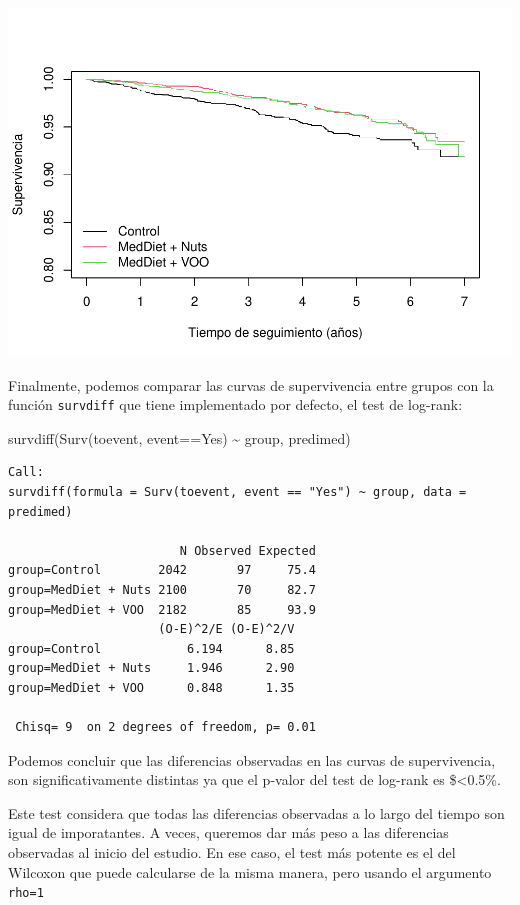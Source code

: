 \documentclass[
]{book}
\newenvironment{Shaded}{\begin{snugshade}}{\end{snugshade}}
\newcommand{\FunctionTok}[1]{\textcolor[rgb]{0.00,0.00,0.00}{#1}}
\newcommand{\NormalTok}[1]{#1}
\newcommand{\SpecialCharTok}[1]{\textcolor[rgb]{0.00,0.00,0.00}{#1}}
\newcommand{\StringTok}[1]{\textcolor[rgb]{0.31,0.60,0.02}{#1}}
\begin{document}
\includegraphics{fig_out/unnamed-chunk-154-1.pdf}

Finalmente, podemos comparar las curvas de supervivencia entre grupos con la función \texttt{survdiff} que tiene implementado por defecto, el test de log-rank:

\begin{Shaded}
\begin{Highlighting}[]
\FunctionTok{survdiff}\NormalTok{(}\FunctionTok{Surv}\NormalTok{(toevent, event}\SpecialCharTok{==}\StringTok{\textquotesingle{}Yes\textquotesingle{}}\NormalTok{) }\SpecialCharTok{\textasciitilde{}}\NormalTok{ group, predimed)}
\end{Highlighting}
\end{Shaded}

\begin{verbatim}
Call:
survdiff(formula = Surv(toevent, event == "Yes") ~ group, data = predimed)

                        N Observed Expected
group=Control        2042       97     75.4
group=MedDiet + Nuts 2100       70     82.7
group=MedDiet + VOO  2182       85     93.9
                     (O-E)^2/E (O-E)^2/V
group=Control            6.194      8.85
group=MedDiet + Nuts     1.946      2.90
group=MedDiet + VOO      0.848      1.35

 Chisq= 9  on 2 degrees of freedom, p= 0.01 
\end{verbatim}

Podemos concluir que las diferencias observadas en las curvas de supervivencia, son significativamente distintas ya que el p-valor del test de log-rank es \$\textless0.5\%.

Este test considera que todas las diferencias observadas a lo largo del tiempo son igual de imporatantes. A veces, queremos dar más peso a las diferencias observadas al inicio del estudio. En ese caso, el test más potente es el del Wilcoxon que puede calcularse de la misma manera, pero usando el argumento \texttt{rho=1}
\end{document}
